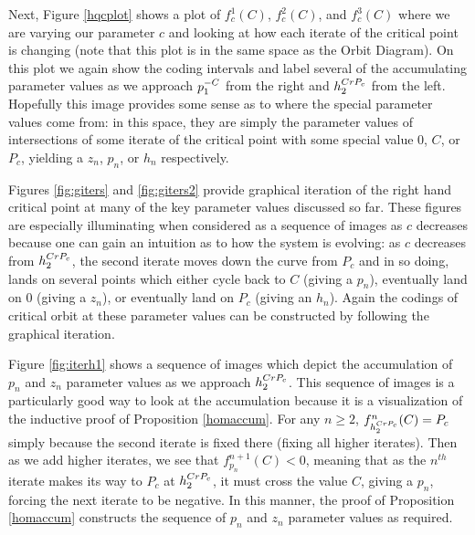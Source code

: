 Next, Figure \ref{hqcplot} shows a plot of $f_c^1 (C)$, $f_c^2 (C)$, and $f_c^3 (C)$ where we are varying our parameter $c$ and looking at how each iterate of the critical point is changing (note that this plot is in the same space as the Orbit Diagram). On this plot we again show the coding intervals and label several of the accumulating parameter values as we approach $p^{-C}_1$ from the right and $h^{CrP_c}_2$ from the left. Hopefully this image provides some sense as to where the special parameter values come from: in this space, they are simply the parameter values of intersections of some iterate of the critical point with some special value 0, $C$, or $P_c$, yielding a $z_n$, $p_n$, or $h_n$ respectively.

Figures \ref{fig:giters} and \ref{fig:giters2} provide graphical iteration of the right hand critical point at many of the key parameter values discussed so far. These figures are especially illuminating when considered as a sequence of images as $c$ decreases because one can gain an intuition as to how the system is evolving: as $c$ decreases from $h^{CrP_c}_2$, the second iterate moves down the curve from $P_c$ and in so doing, lands on several points which either cycle back to $C$ (giving a $p_n$), eventually land on 0 (giving a $z_n$), or eventually land on $P_c$ (giving an $h_n$). Again the codings of critical orbit at these parameter values can be constructed by following the graphical iteration.

Figure \ref{fig:iterh1} shows a sequence of images which depict the accumulation of $p_n$ and $z_n$ parameter values as we approach $h^{CrP_c}_2$. This sequence of images is a particularly good way to look at the accumulation because it is a visualization of the inductive proof of Proposition \ref{homaccum}. For any $n \geq 2$, $f^n_{h^{CrP_c}_2} (C) = P_c$ simply because the second iterate is fixed there (fixing all higher iterates). Then as we add higher iterates, we see that $f^{n+1}_{p_n} (C) < 0$, meaning that as the $n^{th}$ iterate makes its way to $P_c$ at $h^{CrP_c}_2$, it must cross the value $C$, giving a $p_n$, forcing the next iterate to be negative. In this manner, the proof of Proposition \ref{homaccum} constructs the sequence of $p_n$ and $z_n$ parameter values as required.

